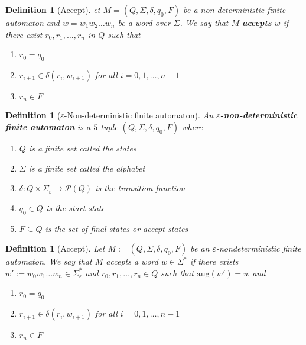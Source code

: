 \documentclass{article}
\theoremstyle{break}
\newtheorem{definition}[theorem]{Definition}
\begin{document}
\begin{definition}[Accept]
\label{def:nondeterministic-finite-automaton-accept}
et $M=(Q,\Sigma,\delta,q_0,F)$ be a non-deterministic finite automaton and $w = w_1w_2\ldots w_n$ be a word over $\Sigma$. 
We say that $M$ \textbf{accepts} $w$ if there exist $r_0, r_1, \ldots, r_n$ in $Q$ such that
\begin{enumerate}
  \item $r_0=q_0$
  \item $r_{i+1} \in \delta(r_i, w_{i+1})$ for all $i = 0,1,\ldots, n-1$
  \item $r_n\in F$
\end{enumerate}
\end{definition}

\begin{definition}[$\varepsilon$-Non-deterministic finite automaton]
\label{def:epsilon-nondeterministic-finite-automaton}
  An \textbf{$\varepsilon$-non-deterministic finite automaton} is a $5$-tuple $(Q,\Sigma,\delta,q_0,F)$ where
  \begin{enumerate}
      \item $Q$ is a finite set called the \textit{states}
      \item $\Sigma$ is a finite set called the \textit{alphabet}
      \item $\delta: Q\times\Sigma_{\varepsilon} \to \mathcal{P}(Q)$ is the \textit{transition function}
      \item $q_0\in Q$ is the \textit{start state}
      \item $F \subseteq Q$ is the set of \textit{final states} or \textit{accept states} 
  \end{enumerate}
\end{definition}


\begin{definition}[Accept]
\label{def:epsilon-nondeterministic-finite-automaton-accept-aug}
Let $M:=(Q,\Sigma,\delta,q_0,F)$ be an $\varepsilon$-nondeterministic finite automaton.
We say that $M$ accepts a word $w \in \Sigma^*$ if there exists $w':=w_0w_1\ldots w_n \in\Sigma_{\varepsilon}^*$ and $r_0,r_1,\ldots,r_n \in Q$ such that $\textrm{aug}(w')=w$ and
  \begin{enumerate}
    \item $r_0=q_0$
    \item $r_{i+1} \in \delta(r_i, w_{i+1})$ for all $i = 0,1,\ldots, n-1$
    \item $r_n\in F$
  \end{enumerate}
\end{definition}
\end{document}
